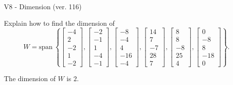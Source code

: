 \begin{exercise}
  \begin{exerciseTitle}V8 - Dimension (ver. 116)\end{exerciseTitle}
  \begin{exerciseStatement}
    Explain how to find the dimension of 
\[W=\mathrm{span}\ \left\{\left[\begin{array}{r}
-4 \\
2 \\
-2 \\
1 \\
-2
\end{array}\right] , \left[\begin{array}{r}
-2 \\
-1 \\
1 \\
-4 \\
-1
\end{array}\right] , \left[\begin{array}{r}
-8 \\
-4 \\
4 \\
-16 \\
-4
\end{array}\right] , \left[\begin{array}{r}
14 \\
7 \\
-7 \\
28 \\
7
\end{array}\right] , \left[\begin{array}{r}
8 \\
8 \\
-8 \\
25 \\
4
\end{array}\right] , \left[\begin{array}{r}
0 \\
-8 \\
8 \\
-18 \\
0
\end{array}\right]\right\}.\]



  \end{exerciseStatement}
  \begin{exerciseAnswer}
   The dimension of \(W\) is  \(2\).
  


  \end{exerciseAnswer}
\end{exercise}